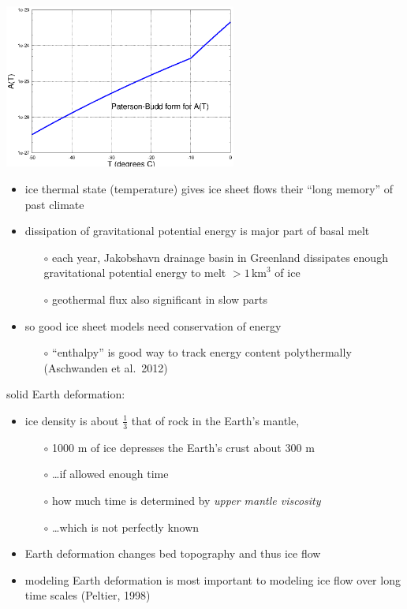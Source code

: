 \documentclass[titlepage,letterpaper,final,12pt]{scrartcl}
\begin{document}
\includegraphics[width=3.0in]{AofT}


\begin{itemize}
\item ice thermal state (temperature) gives ice sheet flows their ``long memory'' of past climate
\item dissipation of gravitational potential energy is major part of basal melt
  \begin{itemize}
  \item[$\circ$] each year, Jakobshavn drainage basin in Greenland dissipates enough gravitational potential energy to melt $> 1\,\text{km}^3$ of ice
  \item[$\circ$] geothermal flux also significant in slow parts
  \end{itemize}
\item so good ice sheet models need conservation of energy
  \begin{itemize}
  \item[$\circ$] ``enthalpy'' is good way to track energy content polythermally (Aschwanden et al.~2012)\nocite{AschwandenBuelerKhroulevBlatter}
  \end{itemize}
\end{itemize}

solid Earth deformation:

\begin{itemize}
\item ice density is about $\frac{1}{3}$ that of rock in the Earth's mantle,
  \begin{itemize}
  \item[$\circ$] 1000 m of ice depresses the Earth's crust about 300 m
  \item[$\circ$] \dots if allowed enough time
  \item[$\circ$] how much time is determined by \emph{upper mantle viscosity}
  \item[$\circ$] \dots which is not perfectly known
  \end{itemize}
\item Earth deformation changes bed topography and thus ice flow
\item modeling Earth deformation is most important to modeling ice flow over long time scales (Peltier, 1998)\nocite{Peltier1998review}
\end{itemize}
\end{document}
